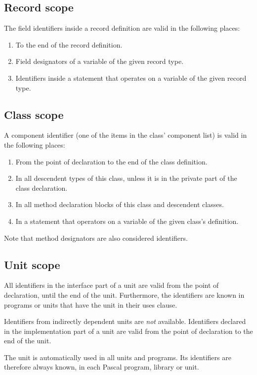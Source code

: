 \subsection{Record scope}
The field identifiers inside a record definition are valid in the following
places:
\begin{enumerate}
\item To the end of the record definition.
\item Field designators of a variable of the given record type.
\item Identifiers inside a  statement that operates on a variable
of the given record type.
\end{enumerate}

\subsection{Class scope}
A component identifier (one of the items in the class' component list) 
is valid in the following places:
\begin{enumerate}
\item From the point of declaration to the end of the class definition.
\item In all descendent types of this class, unless it is in the private
part of the class declaration.
\item In all method declaration blocks of this class and descendent classes.
\item In a  statement that operators on a variable of the given class's
definition.
\end{enumerate}
Note that method designators are also considered identifiers.
\subsection{Unit scope}
All identifiers in the interface part of a unit are valid from the point of
declaration, until the end of the unit. Furthermore, the identifiers are
known in programs or units that have the unit in their uses clause.

Identifiers from indirectly dependent units are {\em not} available.
Identifiers declared in the implementation part of a unit are valid from the
point of declaration to the end of the unit.

The  unit is automatically used in all units and programs.
Its identifiers are therefore always known, in each Pascal program, library
or unit.

